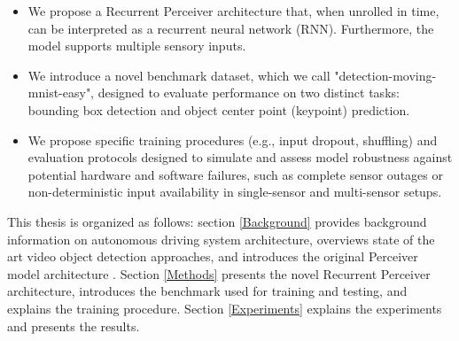 \begin{itemize}
    \item We propose a Recurrent Perceiver architecture that, when unrolled in time, can be interpreted as a recurrent neural network (RNN). Furthermore, the model supports multiple sensory inputs.
    \item We introduce a novel benchmark dataset, which we call "detection-moving-mnist-easy", designed to evaluate performance on two distinct tasks: bounding box detection and object center point (keypoint) prediction.    
    \item We propose specific training procedures (e.g., input dropout, shuffling) and evaluation protocols designed to simulate and assess model robustness against potential hardware and software failures, such as complete sensor outages or non-deterministic input availability in single-sensor and multi-sensor setups.
\end{itemize}

This thesis is organized as follows: section \ref{Background} provides background information on autonomous driving system architecture, overviews state of the art video object detection approaches, and introduces the original Perceiver model architecture \cite{jaeglePerceiverGeneralPerception2021}. Section \ref{Methods} presents the novel Recurrent Perceiver architecture, introduces the benchmark used for training and testing, and explains the training procedure. Section \ref{Experiments} explains the experiments and presents the results.


